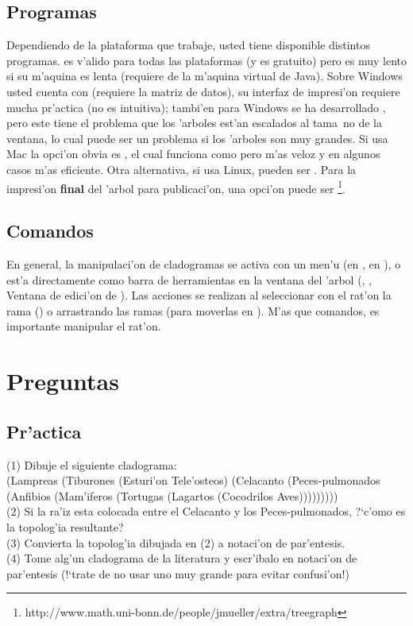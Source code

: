 \subsection{Programas}
Dependiendo de la plataforma que trabaje, usted tiene disponible distintos programas.  es v'alido para todas las plataformas (y es gratuito) pero es muy lento si su m'aquina es lenta (requiere de la m'aquina virtual de Java). Sobre Windows usted cuenta con  (requiere la matriz de datos), su interfaz de impresi'on requiere mucha pr'actica (no es intuitiva); tambi'en para Windows se ha desarrollado , pero este tiene el problema que los 'arboles est'an escalados al tama~no de la ventana, lo cual puede ser un problema si los 'arboles son muy grandes. Si usa Mac la opci'on obvia es , el cual funciona como  pero m'as veloz y en algunos casos m'as eficiente. Otra alternativa, si usa Linux, pueden ser . Para la impresi'on \textbf{final} del 'arbol para publicaci'on, una opci'on puede ser \footnote{http://www.math.uni-bonn.de/people/jmueller/extra/treegraph}.
\subsection{Comandos}
En general, la manipulaci'on de cladogramas se activa con un men'u (en  , en  ), o est'a directamente como barra de herramientas en la ventana del 'arbol (, , Ventana de edici'on de ). Las acciones se realizan al seleccionar con el rat'on la rama () o arrastrando las ramas (para moverlas en ). M'as que comandos, es importante manipular el rat'on.
\section{Preguntas}
\subsection{Pr'actica}
\noindent
(1) Dibuje el siguiente cladograma:\\ 
(Lampreas (Tiburones (Esturi'on Tele'osteos) (Celacanto (Peces-pulmonados (Anfibios (Mam'iferos (Tortugas (Lagartos (Cocodrilos Aves)))))))))\\
(2) Si la ra'iz esta colocada entre el Celacanto y los Peces-pulmonados, ?`c'omo es la topolog'ia resultante?\\
(3) Convierta la topolog'ia dibujada en (2) a notaci'on de par'entesis.\\
(4) Tome alg'un cladograma de la literatura y escr'ibalo en notaci'on de par'entesis (!`trate de no usar uno muy grande para evitar confusi'on!)
